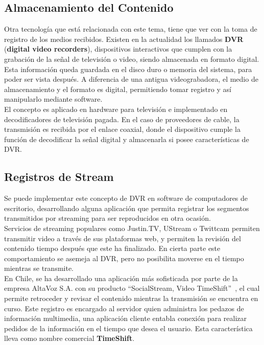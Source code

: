 \subsection{Almacenamiento del Contenido}

Otra tecnología que está relacionada con este tema, tiene que ver con la toma de registro de los medios recibidos. Existen en la actualidad los llamados \textbf{DVR} (\textbf{digital video recorders}), dispositivos interactivos que cumplen con la grabación de la señal de televisión o video, siendo almacenada en formato digital.\\

 Esta información queda guardada en el disco duro o memoria del sistema, para poder ser vista después. A diferencia de una antigua videograbadora, el medio de almacenamiento y el formato es digital, permitiendo tomar registro y así manipularlo mediante software.\\
 
	El concepto es aplicado en hardware para televisión e implementado en decodificadores de televisión pagada. En el caso de proveedores de cable, la transmisión es recibida por el enlace coaxial, donde el dispositivo cumple la función de decodificar la señal digital y almacenarla si posee características de DVR.

\subsection{Registros de Stream}

Se puede implementar este concepto de DVR en software de computadores de escritorio, desarrollando alguna aplicación que permita registrar los segmentos transmitidos por streaming para ser reproducidos en otra ocasión. \\

	Servicios de streaming populares como Justin.TV, UStream o Twittcam permiten transmitir video a través de sus plataformas web, y permiten la revisión del contenido tiempo después que este ha finalizado. En cierta parte este comportamiento se asemeja al DVR, pero no posibilita moverse en el tiempo mientras se transmite.\\

En Chile, se ha desarrollado una aplicación más sofisticada por parte de la empresa AltaVoz S.A. con su producto \textquotedblleft SocialStream, Video TimeShift\textquotedblright \ \cite{sota:altavoz-socialstream}, el cual permite retroceder y revisar el contenido mientras la transmisión se encuentra en curso. Este registro es encargado al servidor quien administra los pedazos de información multimedia, una aplicación cliente entabla conexión para realizar pedidos de la información en el tiempo que desea el usuario.
Esta característica lleva como nombre comercial \textbf{TimeShift}.

